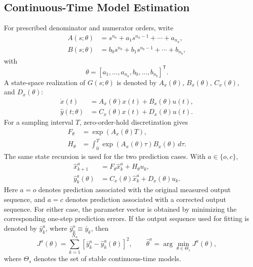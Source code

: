 \documentclass[journal]{IEEEtran}
\begin{document}
\subsection{Continuous-Time Model Estimation}
For prescribed denominator and numerator orders, write
\begin{align}
A(s;\theta)&=s^{n_a}+a_1s^{n_a-1}+\cdots+a_{n_a},\\
B(s;\theta)&=b_0s^{n_b}+b_1s^{n_b-1}+\cdots+b_{n_b},
\end{align}
with
\begin{equation}
\theta=[a_1,\ldots,a_{n_a},b_0,\ldots,b_{n_b}]^{\mathsf T}.
\end{equation}
A state-space realization of $G(s;\theta)$ is denoted by $A_x(\theta)$, $B_x(\theta)$, $C_x(\theta)$, and $D_x(\theta)$:
\begin{align}
\dot x(t)&=A_x(\theta)x(t)+B_x(\theta)u(t),\\
\hat y(t;\theta)&=C_x(\theta)x(t)+D_x(\theta)u(t).
\end{align}
For a sampling interval $T$, zero-order-hold discretization gives
\begin{align}
F_\theta&=\exp\!\left(A_x(\theta)T\right),\\
H_\theta&=\int_0^T \exp\!\left(A_x(\theta)\tau\right)B_x(\theta)\,d\tau.
\end{align}
The same state recursion is used for the two prediction cases. With $a\in\{o,c\}$,
\begin{align}
\hat x_{k+1}^{a}&=F_\theta\hat x_k^{a}+H_\theta u_k,\\
\hat y_k^{a}(\theta)&=C_x(\theta)\hat x_k^{a}+D_x(\theta)u_k.
\end{align}
Here $a=o$ denotes prediction associated with the original measured output sequence, and $a=c$ denotes prediction associated with a corrected output sequence. For either case, the parameter vector is obtained by minimizing the corresponding one-step prediction errors. If the output sequence used for fitting is denoted by $\bar y_k^{a}$, where $\bar y_k^{o}\equiv\bar y_k$, then
\begin{equation}
J^{a}(\theta)=\sum_{k=1}^{N_a}\left[\bar y_k^{a}-\hat y_k^{a}(\theta)\right]^2,
\qquad
\hat\theta^{a}=\arg\min_{\theta\in\Theta_s}J^{a}(\theta),
\end{equation}
where $\Theta_s$ denotes the set of stable continuous-time models.
\end{document}
